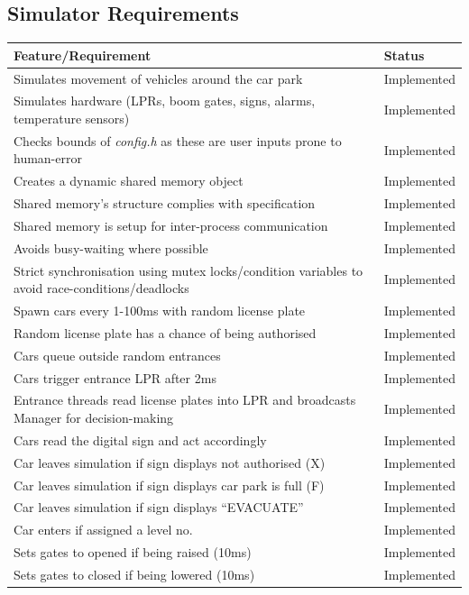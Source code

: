 \documentclass[a4paper]{article}
\begin{document}
\subsection{Simulator Requirements}
\begin{tabular}{|m{24.7em}|l|}
  \hline
  \cellcolor{gray!10} \textbf{Feature\slash Requirement} & \cellcolor{gray!10} \textbf{Status}\\
  \hline
  Simulates movement of vehicles around the car park &\cellcolor{green!40}Implemented\\
  \hline
  Simulates hardware (LPRs, boom gates, signs, alarms, temperature sensors) & \cellcolor{green!40}Implemented\\
  \hline
  Checks bounds of \emph{config.h} as these are user inputs prone to human-error & \cellcolor{green!40}Implemented\\
  \hline
  Creates a dynamic shared memory object &\cellcolor{green!40}Implemented\\
  \hline
  Shared memory’s structure complies with specification &\cellcolor{green!40}Implemented\\
  \hline
  Shared memory is setup for inter-process communication &\cellcolor{green!40}Implemented\\
  \hline
  Avoids busy-waiting where possible & \cellcolor{green!40}Implemented\\
  \hline
  Strict synchronisation using mutex locks/condition variables to avoid race-conditions/deadlocks & \cellcolor{green!40}Implemented\\
  \hline
  Spawn cars every 1-100ms with random license plate& \cellcolor{green!40}Implemented\\
  \hline
  Random license plate has a chance of being authorised & \cellcolor{green!40}Implemented\\
  \hline
  Cars queue outside random entrances & \cellcolor{green!40}Implemented\\
  \hline
  Cars trigger entrance LPR after 2ms & \cellcolor{green!40}Implemented\\
  \hline
  Entrance threads read license plates into LPR and broadcasts Manager for decision-making & \cellcolor{green!40}Implemented\\
  \hline
  Cars read the digital sign and act accordingly & \cellcolor{green!40}Implemented\\
  \hline
  Car leaves simulation if sign displays not authorised (X) & \cellcolor{green!40}Implemented\\
  \hline
  Car leaves simulation if sign displays car park is full (F) & \cellcolor{green!40}Implemented\\
  \hline
  Car leaves simulation if sign displays “EVACUATE” & \cellcolor{green!40}Implemented\\
  \hline
  Car enters if assigned a level no. & \cellcolor{green!40}Implemented\\
  \hline
  Sets gates to opened if being raised (10ms) & \cellcolor{green!40}Implemented\\
  \hline
  Sets gates to closed if being lowered (10ms) & \cellcolor{green!40}Implemented\\
  \hline
\end{tabular}
\end{document}
